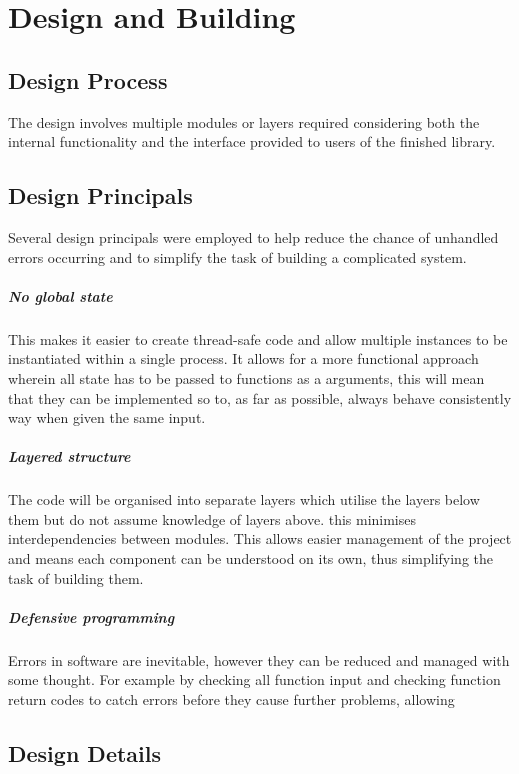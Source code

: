 \documentclass{article}
\begin{document}
\section{Design and Building}

\subsection{Design Process}

The design involves multiple modules or layers
required considering both the internal functionality and the interface provided to users of the finished library.

\subsection{Design Principals}
Several design principals were employed to help reduce the chance of unhandled errors occurring and to simplify the task of building a complicated system.

\subparagraph{No global state}
This makes it easier to create thread-safe code and allow multiple instances to be instantiated within a single process. It allows for a more functional approach wherein all state has to be passed to functions as a arguments, this will mean that they can be implemented so to, as far as possible, always behave consistently way when given the same input.

\subparagraph{Layered structure}
The code will be organised into separate layers which utilise the layers below them but do not assume knowledge of layers above. this minimises interdependencies between modules.
This allows easier management of the project and means each component can be understood on its own, thus simplifying the task of building them.

\subparagraph{Defensive programming}
Errors in software are inevitable, however they can be reduced and managed with some thought. For example by checking all function input and checking function return codes to catch errors before they cause further problems, allowing

\subsection{Design Details}
\end{document}
